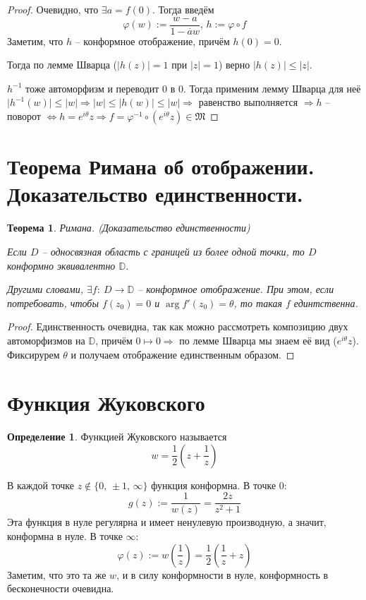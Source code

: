\documentclass[a4paper,12pt]{article}
\renewcommand{\phi}{\ensuremath{\varphi}}
\renewcommand{\leq}{\ensuremath{\leqslant}}
\theoremstyle{plain}
\newtheorem{theorem}{Теорема}[section]
\theoremstyle{definition}
\newtheorem{definition}{Определение}[section]
\theoremstyle{remark}
\begin{document}
\begin{proof}
	Очевидно, что $\exists a = f(0)$. Тогда введём
	\[
		\phi(w) := \frac{w - a}{1 - \overline{a}w},\, h := \phi\circ f
	\]
	Заметим, что $h$ -- конформное отображение, причём $h(0) = 0$.

	Тогда по лемме Шварца ($\vert h(z)\vert = 1$ при $\vert z\vert = 1$) верно $\vert h(z)\vert\leq\vert z\vert$.

	$h^{-1}$ тоже автоморфизм и переводит $0$ в $0$. Тогда применим лемму Шварца для неё $\vert h^{-1}(w)\vert \leq \vert w\vert \Rightarrow \vert w\vert \leq \vert h(w)\vert \leq \vert w\vert \Rightarrow$ равенство выполняется $\Rightarrow h$ -- поворот $\Leftrightarrow h = e^{i\theta}z \Rightarrow f = \phi^{-1}\circ(e^{i\theta}z) \in \mathfrak{M}$
\end{proof}

\section{Теорема Римана об отображении. Доказательство единственности.}
\begin{theorem}
	Римана. (Доказательство единственности)

	Если $D$ -- односвязная область с границей из более одной точки, то $D$ конформно эквивалентно $\mathbb{D}$.

	Другими словами, $\exists f :\: D \to \mathbb{D}$ -- конформное отображение. При этом, если потребовать, чтобы $f(z_0) = 0$ и $\arg f'(z_0) = \theta$, то такая $f$ единтственна.
\end{theorem}

\begin{proof}
	Единственность очевидна, так как можно рассмотреть композицию двух  автоморфизмов на $\mathbb{D}$, причём $0 \mapsto 0 \Rightarrow$ по лемме Шварца мы знаем её вид ($e^{i\theta}z$). Фиксирурем $\theta$ и получаем отображение единственным образом.
\end{proof}

\section{Функция Жуковского}
\begin{definition}
	Функцией Жуковского называется
	\[
		w = \frac{1}{2}\left(z + \frac{1}{z}\right)
	\]
\end{definition}

В каждой точке $z \not\in \{0,\, \pm 1,\, \infty\}$ функция конформна. В точке $0$:
\[
	g(z) := \frac{1}{w(z)} = \frac{2z}{z^2 + 1}
\]
Эта функция в нуле регулярна и имеет ненулевую производную, а значит, конформна в нуле. В точке $\infty$:
\[
	\phi(z) := w\left(\frac{1}{z}\right) = \frac{1}{2}\left(\frac{1}{z} + z\right)
\]
Заметим, что это та же $w$, и в силу конформности в нуле, конформность в бесконечности очевидна.
\end{document}
